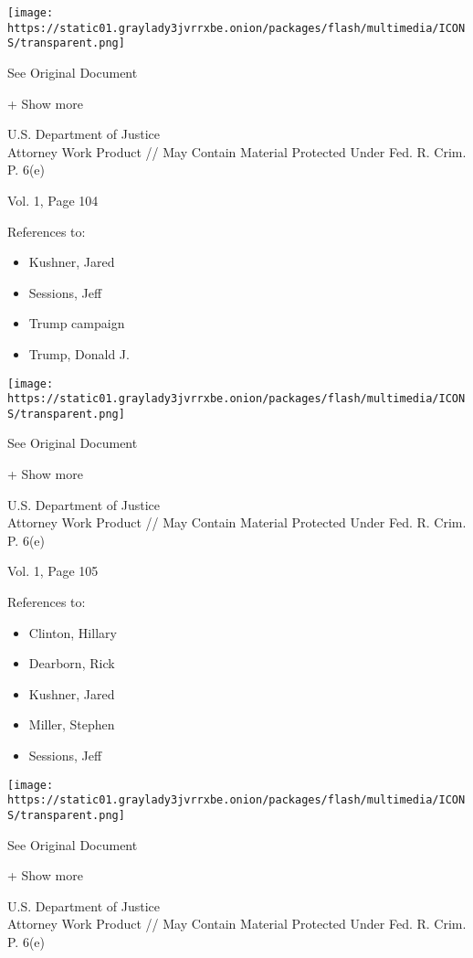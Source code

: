 \protect\hyperlink{}{}

\texttt{[image: https://static01.graylady3jvrrxbe.onion/packages/flash/multimedia/ICONS/transparent.png]}

See Original Document

+ Show more

U.S. Department of Justice\\
Attorney Work Product // May Contain Material Protected Under Fed. R.
Crim. P. 6(e)

Vol. 1, Page 104

References to:

\begin{itemize}
\tightlist
\item
  Kushner, Jared
\item
  Sessions, Jeff
\item
  Trump campaign
\item
  Trump, Donald J.
\end{itemize}

\protect\hyperlink{}{}

\texttt{[image: https://static01.graylady3jvrrxbe.onion/packages/flash/multimedia/ICONS/transparent.png]}

See Original Document

+ Show more

U.S. Department of Justice\\
Attorney Work Product // May Contain Material Protected Under Fed. R.
Crim. P. 6(e)

Vol. 1, Page 105

References to:

\begin{itemize}
\tightlist
\item
  Clinton, Hillary
\item
  Dearborn, Rick
\item
  Kushner, Jared
\item
  Miller, Stephen
\item
  Sessions, Jeff
\end{itemize}

\protect\hyperlink{}{}

\texttt{[image: https://static01.graylady3jvrrxbe.onion/packages/flash/multimedia/ICONS/transparent.png]}

See Original Document

+ Show more

U.S. Department of Justice\\
Attorney Work Product // May Contain Material Protected Under Fed. R.
Crim. P. 6(e)

